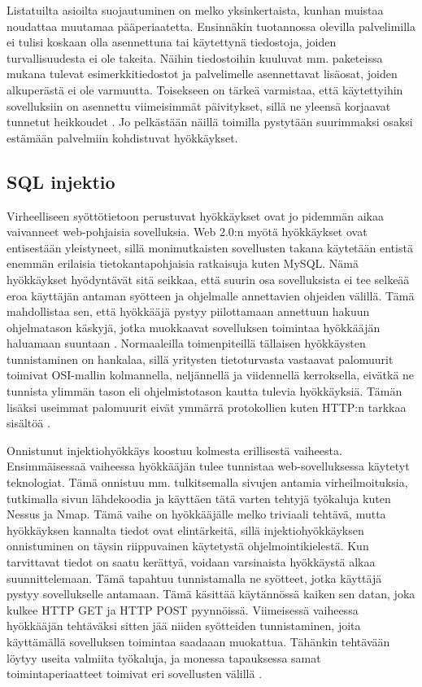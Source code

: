 Listatuilta asioilta suojautuminen on melko yksinkertaista, kunhan muistaa noudattaa muutamaa pääperiaatetta. Ensinnäkin tuotannossa 
olevilla palvelimilla ei tulisi koskaan olla asennettuna tai käytettynä tiedostoja, joiden turvallisuudesta ei ole
takeita. Näihin tiedostoihin kuuluvat mm. paketeissa mukana tulevat esimerkkitiedostot ja palvelimelle asennettavat 
lisäosat, joiden alkuperästä ei ole varmuutta. Toisekseen on tärkeä varmistaa, että käytettyihin sovelluksiin
on asennettu viimeisimmät päivitykset, sillä ne yleensä korjaavat tunnetut heikkoudet \cite{Hacking}. Jo pelkästään näillä 
toimilla pystytään suurimmaksi osaksi estämään palvelmiin kohdistuvat hyökkäykset. 

\subsection{SQL injektio}

Virheelliseen syöttötietoon perustuvat hyökkäykset ovat jo pidemmän aikaa vaivanneet web-pohjaisia sovelluksia.
Web 2.0:n myötä hyökkäykset ovat entisestään yleistyneet, sillä monimutkaisten sovellusten takana käytetään entistä
enemmän erilaisia tietokantapohjaisia ratkaisuja kuten MySQL. Nämä hyökkäykset hyödyntävät sitä seikkaa, että suurin osa
sovelluksista ei tee selkeää eroa käyttäjän antaman syötteen ja ohjelmalle annettavien ohjeiden välillä. Tämä mahdollistaa
sen, että hyökkääjä pystyy piilottamaan annettuun hakuun ohjelmatason käskyjä, jotka muokkaavat sovelluksen toimintaa
hyökkääjän haluamaan suuntaan \cite{WEB2}. Normaaleilla toimenpiteillä tällaisen hyökkäysten tunnistaminen on hankalaa, sillä
yritysten tietoturvasta vastaavat palomuurit toimivat OSI-mallin kolmannella, neljännellä ja viidennellä kerroksella, eivätkä ne tunnista
ylimmän tason eli ohjelmistotason kautta tulevia hyökkäyksiä. Tämän lisäksi useimmat palomuurit eivät ymmärrä protokollien
kuten HTTP:n tarkkaa sisältöä \cite{SQLSS}.    

Onnistunut injektiohyökkäys koostuu kolmesta erillisestä vaiheesta. Ensimmäisessaä vaiheessa hyökkääjän tulee tunnistaa 
web-sovelluksessa käytetyt teknologiat. Tämä onnistuu mm. tulkitsemalla sivujen antamia virheilmoituksia, tutkimalla 
sivun lähdekoodia ja käyttäen tätä varten tehtyjä työkaluja kuten Nessus ja Nmap. Tämä vaihe on hyökkääjälle melko triviaali
tehtävä, mutta hyökkäyksen kannalta tiedot ovat elintärkeitä, sillä injektiohyökkäyksen onnistuminen on täysin riippuvainen 
käytetystä ohjelmointikielestä. Kun tarvittavat tiedot on saatu kerättyä, voidaan varsinaista hyökkäystä alkaa suunnittelemaan.
Tämä tapahtuu tunnistamalla ne syötteet, jotka käyttäjä pystyy sovellukselle antamaan. Tämä käsittää käytännössä kaiken sen 
datan, joka kulkee HTTP GET ja HTTP POST pyynnöissä. Viimeisessä vaiheessa hyökkääjän tehtäväksi sitten jää niiden syötteiden 
tunnistaminen, joita käyttämällä sovelluksen toimintaa saadaaan muokattua. Tähänkin tehtävään löytyy useita valmiita työkaluja, ja
monessa tapauksessa samat toimintaperiaatteet toimivat eri sovellusten välillä \cite{WEB2}.

